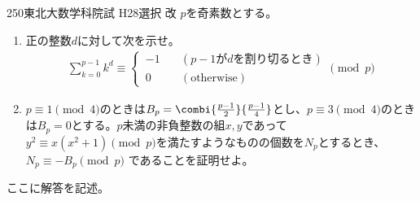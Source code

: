 \begin{prob}{250}{}{東北大数学科院試 H28選択 改}
 $p$を奇素数とする。
 \begin{enumerate}
  \item 正の整数$d$に対して次を示せ。
  \begin{align*}
   \sum_{k=0}^{p-1} k^d \equiv \left\{\,
   \begin{aligned}
    -1 & \quad(p-1\text{が}d\text{を割り切るとき}) \\
    0 & \quad(\text{otherwise})
   \end{aligned}
   \right.\!\!\! \pmod{p}
  \end{align*}
  \item $p\equiv 1\pmod{4}$のときは$B_p=\combi{\frac{p-1}{2}}{\frac{p-1}{4}}$とし、$p\equiv 3\pmod{4}$のときは$B_p=0$とする。$p$未満の非負整数の組$x,y$であって$y^2\equiv x(x^2+1) \pmod{p}$を満たすようなものの個数を$N_p$とするとき、$N_p\equiv -B_p \pmod{p}$ であることを証明せよ。
 \end{enumerate}
\end{prob}

ここに解答を記述。